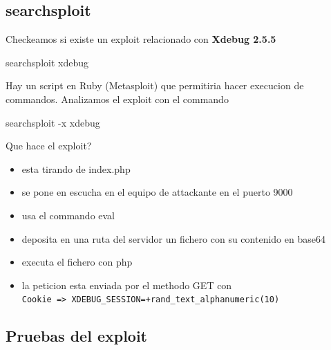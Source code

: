 \documentclass{assets/ipesethesis}
\newenvironment{Shaded}{\begin{snugshade}}{\end{snugshade}}
\newcommand{\ExtensionTok}[1]{#1}
\newcommand{\NormalTok}[1]{#1}
\providecommand{\tightlist}{%
  \setlength{\itemsep}{0pt}\setlength{\parskip}{0pt}}
\begin{document}
\hypertarget{searchsploit}{%
\subsection*{searchsploit}\label{searchsploit}}

Checkeamos si existe un exploit relacionado con \textbf{Xdebug 2.5.5}

\begin{Shaded}
\begin{Highlighting}[]
\ExtensionTok{searchsploit}\NormalTok{ xdebug}
\end{Highlighting}
\end{Shaded}

Hay un script en Ruby (Metasploit) que permitiria hacer execucion de commandos. Analizamos el exploit con el commando

\begin{Shaded}
\begin{Highlighting}[]
\ExtensionTok{searchsploit}\NormalTok{ -x xdebug}
\end{Highlighting}
\end{Shaded}

Que hace el exploit?

\begin{itemize}
\tightlist
\item
  esta tirando de index.php
\item
  se pone en escucha en el equipo de attackante en el puerto 9000
\item
  usa el commando eval
\item
  deposita en una ruta del servidor un fichero con su contenido en base64
\item
  executa el fichero con php
\item
  la peticion esta enviada por el methodo GET con \texttt{\textquotesingle{}Cookie\textquotesingle{}\ =\textgreater{}\ \textquotesingle{}XDEBUG\_SESSION=+rand\_text\_alphanumeric(10)\textquotesingle{}}
\end{itemize}

\hypertarget{pruebas-del-exploit}{%
\subsection*{Pruebas del exploit}\label{pruebas-del-exploit}}
\end{document}
